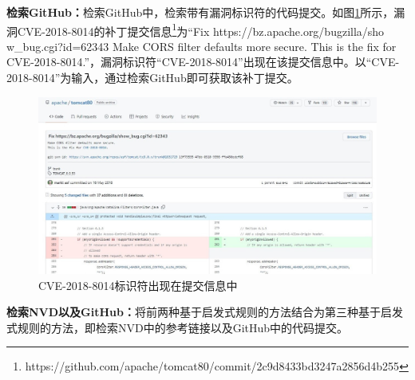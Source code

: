 \textbf{检索GitHub：}检索GitHub中，检索带有漏洞标识符的代码提交。如图\ref{fig:commitmessage}所示，漏洞CVE-2018-8014的补丁提交信息\footnote{https://github.com/apache/tomcat80/commit/2c9d8433bd3247a2856d4b255}为“Fix https://bz.apache.org/bugzilla/sho\\w\_bug.cgi?id=62343 Make CORS filter defaults more secure. This is the fix for CVE-2018-8014.”，漏洞标识符“CVE-2018-8014”出现在该提交信息中。以“CVE-2018-8014”为输入，通过检索GitHub即可获取该补丁提交。%
\begin{figure}[!t]
    \centering
    \includegraphics[scale=0.45]{fig/CVE in commit message.jpg}
    \caption{CVE-2018-8014标识符出现在提交信息中}\label{fig:commitmessage}
\end{figure}

\textbf{检索NVD以及GitHub：}将前两种基于启发式规则的方法结合为第三种基于启发式规则的方法，即检索NVD中的参考链接以及GitHub中的代码提交。

